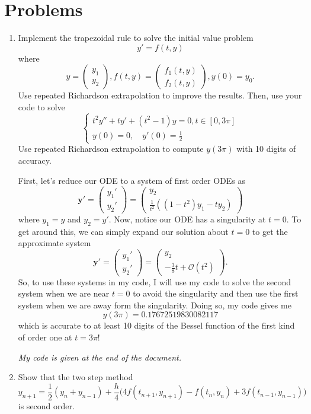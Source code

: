 \documentclass[a4paper,12pt]{article}
\newcommand{\bigO}{\mathcal{O}}
\newcommand{\pmat}[1]{\begin{pmatrix} #1 \end{pmatrix}}
\begin{document}
\section*{Problems}
\begin{enumerate}[label = (\arabic*)]
	\item Implement the trapezoidal rule to solve the initial value problem
	\[
		y' = f(t, y)
	\]
	where
	\[
		y = \pmat{y_1 \\ y_2}, f(t, y) = \pmat{f_1(t, y) \\ f_2(t, y)}, y(0) = y_0.
	\]
	Use repeated Richardson extrapolation to improve the results. Then, use your code to solve
	\[
		\begin{cases}
			t^2 y'' + t y' + (t^2 - 1 ) y = 0, t \in [0, 3\pi] \\
			y(0) = 0, \quad y'(0) = \frac{1}{2}
		\end{cases}
	\]
	Use repeated Richardson extrapolation to compute $ y(3\pi) $ with 10 digits of accuracy.
	
	First, let's reduce our ODE to a system of first order ODEs as
	\[
		\mathbf{y}' = \pmat{y_1' \\ y_2'}= \pmat{y_2 \\ \frac{1}{t^2}((1 - t^2)y_1 - t y_2)}
	\]
	where $ y_1 = y $ and $ y_2 = y' $. Now, notice our ODE has a singularity at $ t = 0 $. To get around this, we can simply expand our solution about $ t = 0 $ to get the approximate system
	\[
		\mathbf{y}' = \pmat{y_1' \\ y_2'}= \pmat{y_2 \\ -\frac{3}{8} t + \bigO(t^2)}.
	\]
	So, to use these systems in my code, I will use my code to solve the second system when we are near $ t = 0 $ to avoid the singularity and then use the first system when we are away form the singularity. Doing so, my code gives me 
	\[
		y(3\pi) = 0.17672519830082117
	\]
	which is accurate to at least 10 digits of the Bessel function of the first kind of order one at $ t = 3\pi $!
	
	\begin{center}
		\emph{My code is given at the end of the document.}
	\end{center}
	
	\newpage
	\item Show that the two step method
	\[
		y_{n + 1} = \frac{1}{2} (y_n + y_{n - 1}) + \frac{h}{4} \big(4 f(t_{n + 1}, y_{n + 1}) - f(t_n, y_n) + 3 f(t_{n - 1}, y_{n - 1})\big)
	\]
	is second order.
	

\end{enumerate}
\end{document}
